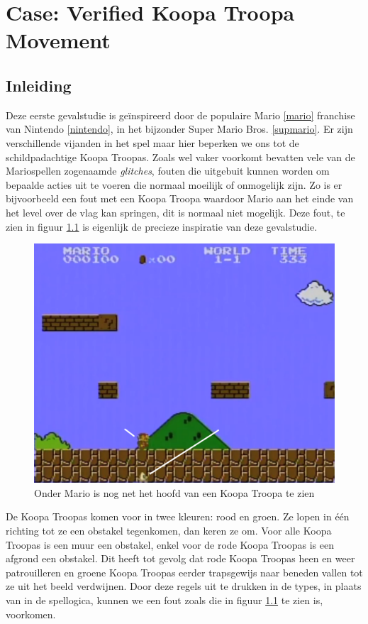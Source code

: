 \chapter{Case: Verified Koopa Troopa Movement}
\label{ch:case-koopa}


\section{Inleiding}

Deze eerste gevalstudie is geïnspireerd door de populaire Mario \ref{mario}
franchise van Nintendo \ref{nintendo}, in het bijzonder Super Mario Bros.
\ref{supmario}. Er zijn verschillende vijanden in het spel maar hier beperken
we ons tot de schildpadachtige Koopa Troopas. Zoals wel vaker voorkomt bevatten
vele van de Mariospellen zogenaamde \emph{glitches}, fouten die uitgebuit
kunnen worden om bepaalde acties uit te voeren die normaal moeilijk of
onmogelijk zijn. Zo is er bijvoorbeeld een fout met een Koopa Troopa waardoor
Mario aan het einde van het level over de vlag kan springen, dit is normaal
niet mogelijk. Deze fout, te zien in figuur \ref{koopaglitch} is eigenlijk de
precieze inspiratie van deze gevalstudie.

\begin{figure}
  \centering
  \includegraphics[width=\linewidth]{figures/KoopaTroopaGlitch}
  \caption{Onder Mario is nog net het hoofd van een Koopa Troopa te zien}
  \label{koopaglitch}
\end{figure}

De Koopa Troopas komen voor in twee kleuren: rood en groen. Ze lopen in één
richting tot ze een obstakel tegenkomen, dan keren ze om. Voor alle Koopa
Troopas is een muur een obstakel, enkel voor de rode Koopa Troopas is een
afgrond een obstakel. Dit heeft tot gevolg dat rode Koopa Troopas heen en weer
patrouilleren en groene Koopa Troopas eerder trapsgewijs naar beneden vallen
tot ze uit het beeld verdwijnen. Door deze regels uit te drukken in de types,
in plaats van in de spellogica, kunnen we een fout zoals die in figuur
\ref{koopaglitch} te zien is, voorkomen.


